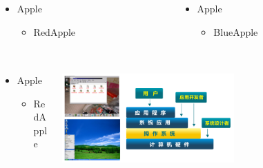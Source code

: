 \begin{frame}[t]
	\frametitle{ }
	\begin{columns}[t]
		\begin{column}{.5\textwidth}

		\begin{itemize}\Large
			\item Apple
			\begin{itemize}\large
				\item RedApple
				
			\end{itemize}
		\end{itemize}

		\end{column}
	
		\begin{column}{.5\textwidth}

		\begin{itemize}\Large
			\item Apple
			\begin{itemize}\large
				\item BlueApple
				
			\end{itemize}
		\end{itemize}
		
		\end{column}
	\end{columns}
\end{frame}

\begin{frame}[t]
	\frametitle{ }
	\begin{columns}[t]
		\begin{column}{.5\textwidth}
			
			\begin{itemize}\Large
				\item Apple
				\begin{itemize}\large
					\item RedApple
					
				\end{itemize}
			\end{itemize}
			
		\end{column}
		
		\begin{column}{.5\textwidth}
			
		\includegraphics[width=0.6\textwidth]{os-position}
			
		\end{column}
	\end{columns}
\end{frame}

